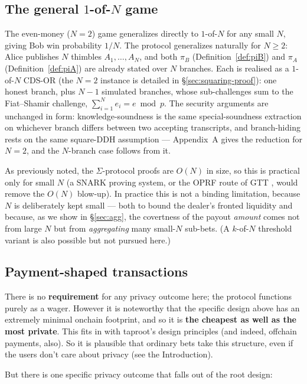 \documentclass[11pt]{article}
\begin{document}
\subsection{The general $1$-of-$N$ game}
\label{sec:nary}

The even-money ($N=2$) game generalizes directly to $1$-of-$N$ for any small $N$, giving Bob win probability $1/N$. The protocol generalizes naturally for $N \ge 2$: Alice publishes $N$ thimbles $A_1,\dots,A_N$, and both $\pi_B$ (Definition~\ref{def:piB}) and $\pi_A$ (Definition~\ref{def:piA}) are already stated over $N$ branches. Each is realised as a $1$-of-$N$ CDS-OR (the $N=2$ instance is detailed in \S\ref{sec:squaring-proof}): one honest branch, plus $N-1$ simulated branches, whose sub-challenges sum to the Fiat--Shamir challenge, $\sum_{i=1}^{N} e_i = e \bmod p$. The security arguments are unchanged in form: knowledge-soundness is the same special-soundness extraction on whichever branch differs between two accepting transcripts, and branch-hiding rests on the same square-DDH assumption --- Appendix~A gives the reduction for $N=2$, and the $N$-branch case follows from it.

As previously noted, the $\Sigma$-protocol proofs are $O(N)$ in size, so this is practical only for small $N$ (a SNARK proving system, or the OPRF route of GTT \cite{gerhardt2026}, would remove the $O(N)$ blow-up). In practice this is not a binding limitation, because $N$ is deliberately kept small --- both to bound the dealer's fronted liquidity and because, as we show in \S\ref{sec:agg}, the covertness of the payout \emph{amount} comes not from large $N$ but from \emph{aggregating} many small-$N$ sub-bets. (A $k$-of-$N$ threshold variant is also possible but not pursued here.)

\subsection{Payment-shaped transactions}
\label{sec:pst}

There is no \textbf{requirement} for any privacy outcome here; the protocol functions purely as a wager. However it is noteworthy that the specific design above has an extremely minimal onchain footprint, and so it is \textbf{the cheapest as well as the most private}. This fits in with taproot's design principles (and indeed, offchain payments, also). So it is plausible that ordinary bets take this structure, even if the users don't care about privacy (see the Introduction).

But there is one specific privacy outcome that falls out of the root design:
\end{document}
